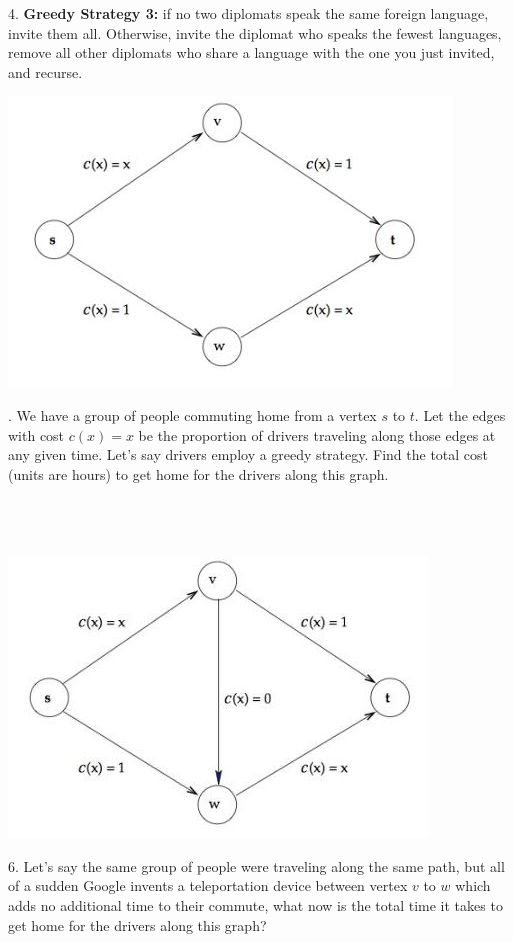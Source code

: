 \documentclass[12pt]{article}
\begin{document}
4. \textbf{Greedy Strategy 3:} if no two diplomats speak the 
same foreign language, invite them all. Otherwise,
invite the diplomat who speaks the fewest languages, 
remove all other diplomats who share a language
with the one you just invited, and recurse.
\newpage
\centerline{\includegraphics[scale = .7]{braess1.jpg}}
. We have a group of people commuting home from a vertex $s$ to $t$.
Let the edges with cost $c(x) = x$ be the proportion
of drivers traveling along those edges at any given time. 
Let's say drivers employ a greedy strategy.
Find the total cost (units are hours) to get home for the drivers along this graph.\\\\\\\\
\centerline{\includegraphics[scale = .7]{braess2.jpg}}
6. Let's say the same group of people were traveling along the same path,
but all of a sudden Google invents a teleportation device between vertex $v$ to $w$ which
adds no additional time to their commute,
what now is the total time it takes to get home for the drivers along this graph?\\\\\\\\
\end{document}
